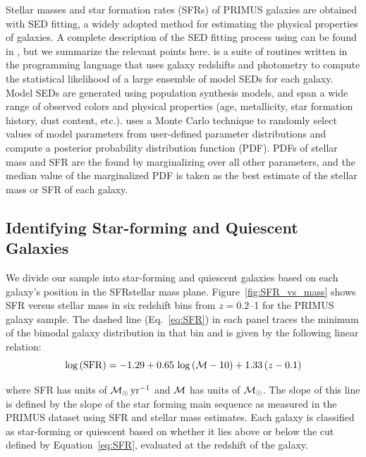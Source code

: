 Stellar masses and star formation rates (SFRs) of PRIMUS galaxies are obtained with SED fitting, a widely adopted method for estimating the physical properties of galaxies.
A complete description of the SED fitting process using \iSEDfit can be found in \citet{Moustakas13}, but we summarize the relevant points here.
\iSEDfit is a suite of routines written in the \IDL programming language that uses galaxy redshifts and photometry to compute the statistical likelihood of a large ensemble of model SEDs for each galaxy.
Model SEDs are generated using population synthesis models, and span a wide range of observed colors and physical properties (age, metallicity, star formation history, dust content, etc.).
\iSEDfit uses a Monte Carlo technique to randomly select values of model parameters from user-defined parameter distributions and compute a posterior probability distribution function (PDF).
PDFs of stellar mass and SFR are the found by marginalizing over all other parameters, and the median value of the marginalized PDF is taken as the best estimate of the stellar mass or SFR of each galaxy.

\subsection{Identifying Star-forming and Quiescent Galaxies}\label{sec:SFQ}

We divide our sample into star-forming and quiescent galaxies based on each galaxy's position in the SFR\textendash stellar mass plane. 
Figure~\ref{fig:SFR_vs_mass} shows SFR versus stellar mass in six redshift bins from ${z=0.2}$--1 for the PRIMUS galaxy sample.
The dashed line (Eq.~\ref{eq:SFR}) in each panel traces the minimum of the bimodal galaxy distribution in that bin and is given by the following linear relation:
\begin{equation}
\log\,({\rm SFR}) = -1.29 + 0.65\,\log\,(\mass - 10) + 1.33\,(z - 0.1)
\label{eq:SFR}
\end{equation}

\noindent where SFR has units of $\sfrunit$ and $\mass$ has units of $\msun$.
The slope of this line is defined by the slope of the star forming main sequence \citep{Noeske07} as measured in the PRIMUS dataset using \iSEDfit SFR and stellar mass estimates. 
Each galaxy is classified as star-forming or quiescent based on whether it lies above or below the cut defined by Equation~\ref{eq:SFR}, evaluated at the redshift of the galaxy.

